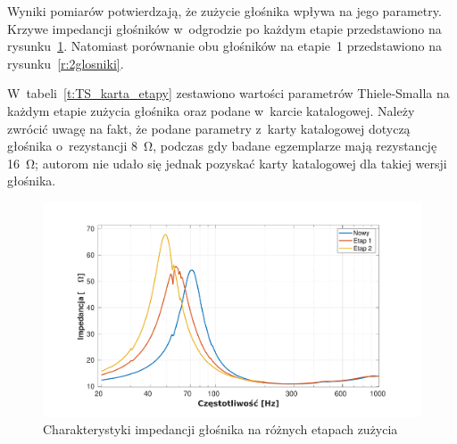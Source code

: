 \documentclass[12pt]{oska}
\begin{document}
	Wyniki pomiarów potwierdzają, że zużycie głośnika wpływa na jego parametry. Krzywe impedancji głośników w~odgrodzie po każdym etapie przedstawiono na rysunku~\ref{r:wygrzewanie}. Natomiast porównanie obu głośników na etapie~1 przedstawiono na rysunku~\ref{r:2glosniki}.
	
	W~tabeli~\ref{t:TS_karta_etapy} zestawiono wartości parametrów Thiele-Smalla na każdym etapie zużycia głośnika oraz podane w~karcie katalogowej. Należy zwrócić uwagę na fakt, że podane parametry z~karty katalogowej dotyczą głośnika o~rezystancji \SI{8}{\ohm}, podczas gdy badane egzemplarze mają rezystancję \SI{16}{\ohm}; autorom nie udało się jednak pozyskać karty katalogowej dla takiej wersji głośnika.
	
	\begin{figure}[!ht]
	\centering
	\includegraphics[width=.8\textwidth,trim={2cm .5cm 2cm 1cm},clip]{odgroda_wygrzewanie.pdf}
	\caption{Charakterystyki impedancji głośnika na różnych etapach zużycia}
	\label{r:wygrzewanie}
	\end{figure}
	
\end{document}
